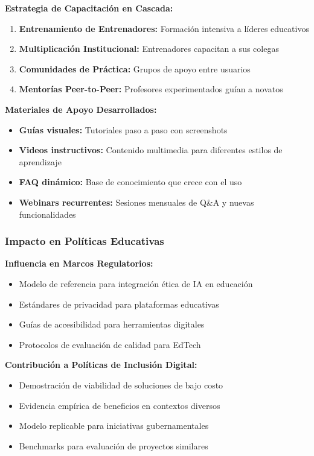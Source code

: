 \documentclass[12pt,a4paper]{report}
\begin{document}
\textbf{Estrategia de Capacitación en Cascada:}
\begin{enumerate}
\item \textbf{Entrenamiento de Entrenadores:} Formación intensiva a líderes educativos
\item \textbf{Multiplicación Institucional:} Entrenadores capacitan a sus colegas
\item \textbf{Comunidades de Práctica:} Grupos de apoyo entre usuarios
\item \textbf{Mentorías Peer-to-Peer:} Profesores experimentados guían a novatos
\end{enumerate}

\textbf{Materiales de Apoyo Desarrollados:}
\begin{itemize}
\item \textbf{Guías visuales:} Tutoriales paso a paso con screenshots
\item \textbf{Videos instructivos:} Contenido multimedia para diferentes estilos de aprendizaje
\item \textbf{FAQ dinámico:} Base de conocimiento que crece con el uso
\item \textbf{Webinars recurrentes:} Sesiones mensuales de Q\&A y nuevas funcionalidades
\end{itemize}

\subsubsection{Impacto en Políticas Educativas}

\textbf{Influencia en Marcos Regulatorios:}
\begin{itemize}
\item Modelo de referencia para integración ética de IA en educación
\item Estándares de privacidad para plataformas educativas
\item Guías de accesibilidad para herramientas digitales
\item Protocolos de evaluación de calidad para EdTech
\end{itemize}

\textbf{Contribución a Políticas de Inclusión Digital:}
\begin{itemize}
\item Demostración de viabilidad de soluciones de bajo costo
\item Evidencia empírica de beneficios en contextos diversos
\item Modelo replicable para iniciativas gubernamentales
\item Benchmarks para evaluación de proyectos similares
\end{itemize}
\end{document}
